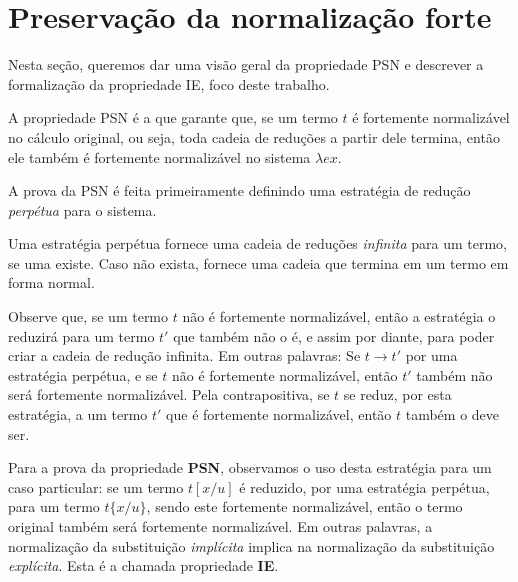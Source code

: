 


\section{Preservação da normalização forte}
\label{sec:psn}

Nesta seção, queremos dar uma visão geral da propriedade PSN e descrever a
formalização da propriedade IE, foco deste trabalho. 

A propriedade PSN é a que garante que, se um termo $t$ é fortemente
normalizável no cálculo original, ou seja, toda cadeia de reduções a partir dele
termina, então ele também é fortemente normalizável no sistema $\lambda ex$.

A prova da PSN é feita primeiramente definindo uma estratégia de redução
\emph{perpétua} para o sistema.

\begin{definicao}
    Uma estratégia perpétua fornece uma cadeia de reduções \emph{infinita} para
    um termo, se uma existe. Caso não exista, fornece uma cadeia que termina em
    um termo em forma normal.
\end{definicao}

Observe que, se um termo $t$ não é fortemente normalizável, então a estratégia o
reduzirá para um termo $t'$ que também não o é, e assim por diante, para poder
criar a cadeia de redução infinita. Em outras palavras: Se $t \rightarrow t'$
por uma estratégia perpétua, e se $t$ não é fortemente normalizável, então $t'$
também não será fortemente normalizável.  Pela contrapositiva, se $t$ se reduz,
por esta estratégia, a um termo $t'$ que é fortemente normalizável, então $t$
também o deve ser.



Para a prova da propriedade \textbf{PSN}, observamos o uso desta estratégia para
um caso particular: se um termo $t[x/u]$ é reduzido, por uma estratégia
perpétua, para um termo $t\{x/u\}$, sendo este fortemente normalizável, então o
termo original também será fortemente normalizável. Em outras palavras, a
normalização da substituição \emph{implícita} implica na normalização da
substituição \emph{explícita}. Esta é a chamada propriedade \textbf{IE}.

